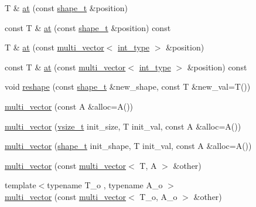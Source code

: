 \begin{DoxyCompactItemize}
\item 
T \& \hyperlink{classIceBRG_1_1multi__vector_ac3c759345706a78af2c1a8a8cde072c7}{at} (const \hyperlink{classIceBRG_1_1multi__vector_a468a7f934274e7aa75e01c94ac58f3ea}{shape\+\_\+t} \&position)
\item 
const T \& \hyperlink{classIceBRG_1_1multi__vector_af3f5a492939e45c036c73d0286ae8505}{at} (const \hyperlink{classIceBRG_1_1multi__vector_a468a7f934274e7aa75e01c94ac58f3ea}{shape\+\_\+t} \&position) const 
\item 
T \& \hyperlink{classIceBRG_1_1multi__vector_a107ef0e6fea9601c2a1cd0fea5bef200}{at} (const \hyperlink{classIceBRG_1_1multi__vector}{multi\+\_\+vector}$<$ \hyperlink{lib_2IceBRG__main_2common_8h_ac4de9d9335536ac22821171deec8d39e}{int\+\_\+type} $>$ \&position)
\item 
const T \& \hyperlink{classIceBRG_1_1multi__vector_aa50615a83dad050c93098950894d8fa5}{at} (const \hyperlink{classIceBRG_1_1multi__vector}{multi\+\_\+vector}$<$ \hyperlink{lib_2IceBRG__main_2common_8h_ac4de9d9335536ac22821171deec8d39e}{int\+\_\+type} $>$ \&position) const 
\item 
void \hyperlink{classIceBRG_1_1multi__vector_a3eceee96718f7144bd056caa4486023e}{reshape} (const \hyperlink{classIceBRG_1_1multi__vector_a468a7f934274e7aa75e01c94ac58f3ea}{shape\+\_\+t} \&new\+\_\+shape, const T \&new\+\_\+val=T())
\item 
\hyperlink{classIceBRG_1_1multi__vector_a6ba7614c52e0dc623fc190d868f8b6ed}{multi\+\_\+vector} (const A \&alloc=A())
\item 
\hyperlink{classIceBRG_1_1multi__vector_a7bdea87bcffcdc2053cd65ba21dd3e95}{multi\+\_\+vector} (\hyperlink{classIceBRG_1_1multi__vector_abcc3d84f2afbb3e4239cea8c2c4923c3}{vsize\+\_\+t} init\+\_\+size, T init\+\_\+val, const A \&alloc=A())
\item 
\hyperlink{classIceBRG_1_1multi__vector_ae94a23b09a6f6bc737481c132332346b}{multi\+\_\+vector} (\hyperlink{classIceBRG_1_1multi__vector_a468a7f934274e7aa75e01c94ac58f3ea}{shape\+\_\+t} init\+\_\+shape, T init\+\_\+val, const A \&alloc=A())
\item 
\hyperlink{classIceBRG_1_1multi__vector_aafd73188953583a68c242bbb201311ae}{multi\+\_\+vector} (const \hyperlink{classIceBRG_1_1multi__vector}{multi\+\_\+vector}$<$ T, A $>$ \&other)
\item 
{\footnotesize template$<$typename T\+\_\+o , typename A\+\_\+o $>$ }\\\hyperlink{classIceBRG_1_1multi__vector_a1fcceaa14320c72bc437883f8d194bc2}{multi\+\_\+vector} (const \hyperlink{classIceBRG_1_1multi__vector}{multi\+\_\+vector}$<$ T\+\_\+o, A\+\_\+o $>$ \&other)

\end{DoxyCompactItemize}
